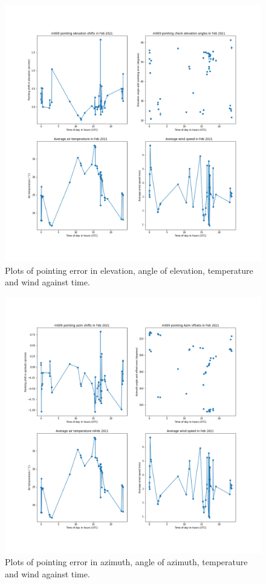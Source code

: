 \documentclass{article}
\begin{document}
\begin{figure}[H]
	\centering
	\includegraphics[scale=0.45]{m009_elev_Feb_mapped.png}
	
	\caption{Plots of pointing error in elevation, angle of elevation, temperature and wind against time.}
	\label{fig:m009ElevFebMapped}
\end{figure}

\begin{figure}[H]
	\centering
	\includegraphics[scale=0.45]{m009_azim_Feb_mapped.png}
	
	\caption{Plots of pointing error in azimuth, angle of azimuth, temperature and wind against time.}
	\label{fig:m009AzimFebMapped}
\end{figure}
\end{document}
